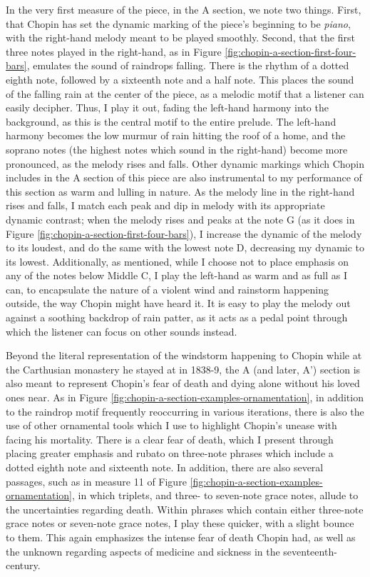 In the very first measure of the piece, in the A section, we note two things. First, that Chopin has set the dynamic marking of the piece's beginning to be \textit{piano}, with the right-hand melody meant to be played smoothly. Second, that the first three notes played in the right-hand, as in Figure \ref{fig:chopin-a-section-first-four-bars}\autocite{Hansen_1973}, emulates the sound of raindrops falling. There is the rhythm of a dotted eighth note, followed by a sixteenth note and a half note. This places the sound of the falling rain at the center of the piece, as a melodic motif that a listener can easily decipher. Thus, I play it out, fading the left-hand harmony into the background, as this is the central motif to the entire prelude. The left-hand harmony becomes the low murmur of rain hitting the roof of a home, and the soprano notes (the highest notes which sound in the right-hand) become more pronounced, as the melody rises and falls. Other dynamic markings which Chopin includes in the A section of this piece are also instrumental to my performance of this section as warm and lulling in nature. As the melody line in the right-hand rises and falls, I match each peak and dip in melody with its appropriate dynamic contrast; when the melody rises and peaks at the note G (as it does in Figure \ref{fig:chopin-a-section-first-four-bars}\autocite{Hansen_1973}), I increase the dynamic of the melody to its loudest, and do the same with the lowest note D, decreasing my dynamic to its lowest. Additionally, as mentioned, while I choose not to place emphasis on any of the notes below Middle C, I play the left-hand as warm and as full as I can, to encapsulate the nature of a violent wind and rainstorm happening outside, the way Chopin might have heard it. It is easy to play the melody out against a soothing backdrop of rain patter, as it acts as a pedal point through which the listener can focus on other sounds instead.

Beyond the literal representation of the windstorm happening to Chopin while at the Carthusian monastery he stayed at in 1838-9, the A (and later, A') section is also meant to represent Chopin's fear of death and dying alone without his loved ones near. As in Figure \ref{fig:chopin-a-section-examples-ornamentation}\autocite{Hansen_1973}, in addition to the raindrop motif frequently reoccurring in various iterations, there is also the use of other ornamental tools which I use to highlight Chopin's unease with facing his mortality. There is a clear fear of death, which I present through placing greater emphasis and rubato on three-note phrases which include a dotted eighth note and sixteenth note. In addition, there are also several passages, such as in measure 11 of Figure \ref{fig:chopin-a-section-examples-ornamentation}\autocite{Hansen_1973}, in which triplets, and three- to seven-note grace notes, allude to the uncertainties regarding death. Within phrases which contain either three-note grace notes or seven-note grace notes, I play these quicker, with a slight bounce to them. This again emphasizes the intense fear of death Chopin had, as well as the unknown regarding aspects of medicine and sickness in the seventeenth-century.

